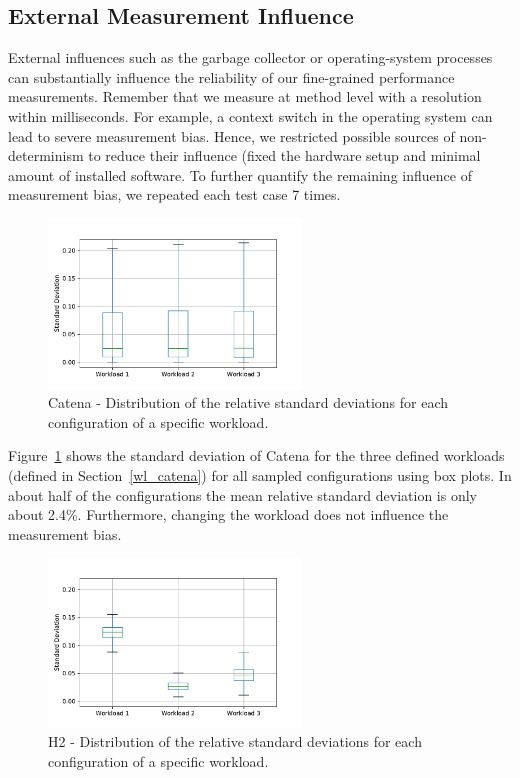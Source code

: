 \subsection{External Measurement Influence}
\label{ext_measurement_infl}

External influences such as the garbage collector or operating-system processes can substantially influence the reliability of our fine-grained performance measurements. Remember that we measure at method level with a resolution within milliseconds. For example, a context switch in the operating system can lead to severe measurement bias. Hence, we restricted possible sources of non-determinism to reduce their influence (fixed the hardware setup and minimal amount of installed software. To further quantify the remaining influence of measurement bias, we repeated each test case 7 times.

\begin{figure}[h]
  \centering
  \includegraphics[width=0.6\textwidth]{images/catena_m_infl_wl_012}
  \caption{Catena - Distribution of the relative standard deviations for each configuration of a specific workload.}
  \label{box_measure_infl_catena}
\end{figure}

Figure~\ref{box_measure_infl_catena} shows the standard deviation of Catena for the three defined workloads (defined in Section~\ref{wl_catena}) for all sampled configurations using box plots. In about half of the configurations the mean relative standard deviation is only about 2.4\%. Furthermore, changing the workload does not influence the measurement bias.

\begin{figure}[h]
  \centering
  \includegraphics[width=0.6\textwidth]{images/h2_m_infl_wl_012}
  \caption{H2 - Distribution of the relative standard deviations for each configuration of a specific workload.}
  \label{box_measure_infl_h2}
\end{figure}

